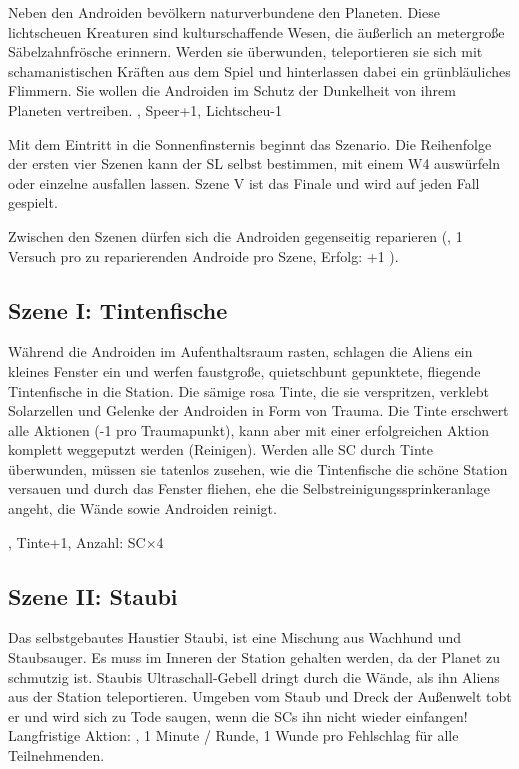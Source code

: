 {		Neben den Androiden bevölkern naturverbundene  den Planeten. Diese lichtscheuen Kreaturen sind kulturschaffende Wesen, die äußerlich an metergroße Säbelzahnfrösche erinnern. Werden sie überwunden, teleportieren sie sich mit schamanistischen Kräften aus dem Spiel und hinterlassen dabei ein grünbläuliches Flimmern. Sie wollen die Androiden im Schutz der Dunkelheit von ihrem Planeten vertreiben. , Speer+1, Lichtscheu-1


		\noindent
		Mit dem Eintritt in die Sonnenfinsternis beginnt das Szenario. Die Reihenfolge der ersten vier Szenen kann der SL selbst bestimmen, mit einem W4 auswürfeln oder einzelne ausfallen lassen. Szene V ist das Finale und wird auf jeden Fall gespielt.

		Zwischen den Szenen dürfen sich die Androiden gegenseitig reparieren (, 1 Versuch pro zu reparierenden Androide pro Szene, Erfolg: +1 \HD).

		\subsection{Szene I: Tintenfische}

		\noindent
		Während die Androiden im Aufenthaltsraum rasten, schlagen die Aliens ein kleines Fenster ein und werfen  faustgroße, quietschbunt gepunktete, fliegende Tintenfische in die Station. Die sämige rosa Tinte, die sie verspritzen, verklebt Solarzellen und Gelenke der Androiden in Form von Trauma. Die Tinte erschwert alle Aktionen (-1 pro Traumapunkt), kann aber mit einer erfolgreichen Aktion komplett weggeputzt werden (Reinigen). Werden alle SC durch Tinte überwunden, müssen sie tatenlos zusehen, wie die Tintenfische die schöne Station versauen und durch das Fenster fliehen, ehe die Selbstreinigungssprinkeranlage angeht, die Wände sowie Androiden reinigt.

		, Tinte+1, Anzahl: SC×4

		\subsection{Szene II: Staubi}

		\noindent
		Das selbstgebautes Haustier Staubi, ist eine Mischung aus Wachhund und Staubsauger. Es muss im Inneren der Station gehalten werden, da der Planet zu schmutzig ist. Staubis Ultraschall-Gebell dringt durch die Wände, als ihn Aliens aus der Station teleportieren. Umgeben vom Staub und Dreck der Außenwelt tobt er und wird sich zu Tode saugen, wenn die SCs ihn nicht wieder einfangen! Langfristige Aktion: , 1 Minute / Runde, 1 Wunde pro Fehlschlag für alle Teilnehmenden.

}

